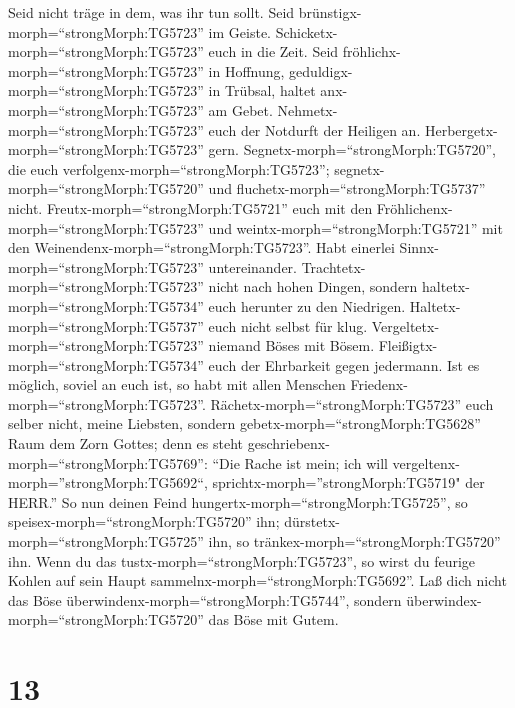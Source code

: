  Seid nicht träge in dem, was ihr tun sollt. Seid
brünstigx-morph=``strongMorph:TG5723'' im Geiste.
Schicketx-morph=``strongMorph:TG5723'' euch in die Zeit. 
Seid fröhlichx-morph=``strongMorph:TG5723'' in Hoffnung,
geduldigx-morph=``strongMorph:TG5723'' in Trübsal, haltet
anx-morph=``strongMorph:TG5723'' am Gebet. 
Nehmetx-morph=``strongMorph:TG5723'' euch der Notdurft der Heiligen an.
Herbergetx-morph=``strongMorph:TG5723'' gern. 
Segnetx-morph=``strongMorph:TG5720'', die euch
verfolgenx-morph=``strongMorph:TG5723'';
segnetx-morph=``strongMorph:TG5720'' und
fluchetx-morph=``strongMorph:TG5737'' nicht. 
Freutx-morph=``strongMorph:TG5721'' euch mit den
Fröhlichenx-morph=``strongMorph:TG5723'' und
weintx-morph=``strongMorph:TG5721'' mit den
Weinendenx-morph=``strongMorph:TG5723''.  Habt einerlei
Sinnx-morph=``strongMorph:TG5723'' untereinander.
Trachtetx-morph=``strongMorph:TG5723'' nicht nach hohen Dingen, sondern
haltetx-morph=``strongMorph:TG5734'' euch herunter zu den Niedrigen.
 Haltetx-morph=``strongMorph:TG5737'' euch nicht selbst für
klug. Vergeltetx-morph=``strongMorph:TG5723'' niemand Böses mit Bösem.
Fleißigtx-morph=``strongMorph:TG5734'' euch der Ehrbarkeit gegen
jedermann.  Ist es möglich, soviel an euch ist, so habt mit
allen Menschen Friedenx-morph=``strongMorph:TG5723''. 
Rächetx-morph=``strongMorph:TG5723'' euch selber nicht, meine Liebsten,
sondern gebetx-morph=``strongMorph:TG5628'' Raum dem Zorn Gottes; denn
es steht geschriebenx-morph=``strongMorph:TG5769'': ``Die Rache ist
mein; ich will vergeltenx-morph=''strongMorph:TG5692``,
sprichtx-morph=''strongMorph:TG5719" der HERR.''  So nun
deinen Feind hungertx-morph=``strongMorph:TG5725'', so
speisex-morph=``strongMorph:TG5720'' ihn;
dürstetx-morph=``strongMorph:TG5725'' ihn, so
tränkex-morph=``strongMorph:TG5720'' ihn. Wenn du das
tustx-morph=``strongMorph:TG5723'', so wirst du feurige Kohlen auf sein
Haupt sammelnx-morph=``strongMorph:TG5692''.  Laß dich
nicht das Böse überwindenx-morph=``strongMorph:TG5744'', sondern
überwindex-morph=``strongMorph:TG5720'' das Böse mit Gutem.

\hypertarget{section-12}{%
\section{13}\label{section-12}}

